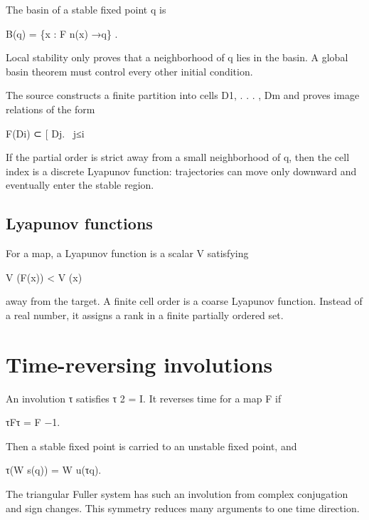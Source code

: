 The basin of a stable fixed point q is


\begin{displaytext}
B(q) = \{x : F n(x) →q\} .
\end{displaytext}

Local stability only proves that a neighborhood of q lies in the basin. A global basin theorem must control every other initial condition.


The source constructs a finite partition into cells D1, . . . , Dm and proves image relations of the form


\begin{displaytext}
F(Di) ⊂ [ Dj. \
j≤i
\end{displaytext}

If the partial order is strict away from a small neighborhood of q, then the cell index is a discrete Lyapunov function: trajectories can move only downward and eventually enter the stable region.


\subsection{Lyapunov functions}

For a map, a Lyapunov function is a scalar V satisfying


V (F(x)) < V (x)


away from the target. A finite cell order is a coarse Lyapunov function. Instead of a real number, it assigns a rank in a finite partially ordered set.


\section{Time-reversing involutions}

\begin{displaytext}
An involution τ satisfies τ 2 = I. It reverses time for a map F if
\end{displaytext}

\begin{displaytext}
τFτ = F −1.
\end{displaytext}

Then a stable fixed point is carried to an unstable fixed point, and


\begin{displaytext}
τ(W s(q)) = W u(τq).
\end{displaytext}

The triangular Fuller system has such an involution from complex conjugation and sign changes. This symmetry reduces many arguments to one time direction.



